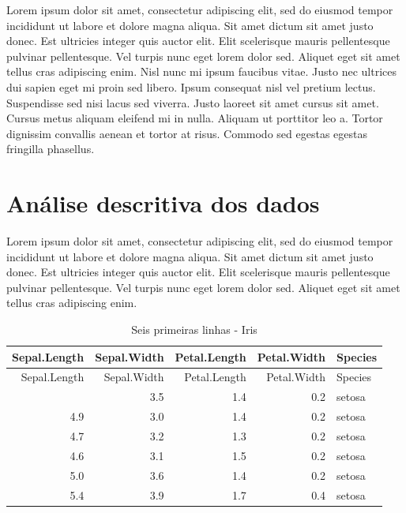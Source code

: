 \documentclass[
  a4paper,
]{report}
\begin{document}
Lorem ipsum dolor sit amet, consectetur adipiscing elit, sed do eiusmod
tempor incididunt ut labore et dolore magna aliqua. Sit amet dictum sit
amet justo donec. Est ultricies integer quis auctor elit. Elit
scelerisque mauris pellentesque pulvinar pellentesque. Vel turpis nunc
eget lorem dolor sed. Aliquet eget sit amet tellus cras adipiscing enim.
Nisl nunc mi ipsum faucibus vitae. Justo nec ultrices dui sapien eget mi
proin sed libero. Ipsum consequat nisl vel pretium lectus. Suspendisse
sed nisi lacus sed viverra. Justo laoreet sit amet cursus sit amet.
Cursus metus aliquam eleifend mi in nulla. Aliquam ut porttitor leo a.
Tortor dignissim convallis aenean et tortor at risus. Commodo sed
egestas egestas fringilla phasellus.

\hypertarget{anuxe1lise-descritiva-dos-dados}{%
\chapter{Análise descritiva dos
dados}\label{anuxe1lise-descritiva-dos-dados}}

Lorem ipsum dolor sit amet, consectetur adipiscing elit, sed do eiusmod
tempor incididunt ut labore et dolore magna aliqua. Sit amet dictum sit
amet justo donec. Est ultricies integer quis auctor elit. Elit
scelerisque mauris pellentesque pulvinar pellentesque. Vel turpis nunc
eget lorem dolor sed. Aliquet eget sit amet tellus cras adipiscing enim.

\begin{longtable}[]{@{}rrrrl@{}}
\caption{Seis primeiras linhas - Iris}\tabularnewline
\toprule\noalign{}
Sepal.Length & Sepal.Width & Petal.Length & Petal.Width & Species \\
\midrule\noalign{}
\endfirsthead
\toprule\noalign{}
Sepal.Length & Sepal.Width & Petal.Length & Petal.Width & Species \\
\midrule\noalign{}
\endhead
\bottomrule\noalign{}
\endlastfoot
5.1 & 3.5 & 1.4 & 0.2 & setosa \\
4.9 & 3.0 & 1.4 & 0.2 & setosa \\
4.7 & 3.2 & 1.3 & 0.2 & setosa \\
4.6 & 3.1 & 1.5 & 0.2 & setosa \\
5.0 & 3.6 & 1.4 & 0.2 & setosa \\
5.4 & 3.9 & 1.7 & 0.4 & setosa \\
\end{longtable}
\end{document}

